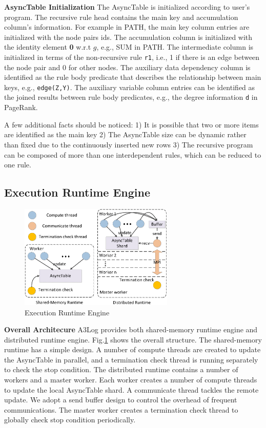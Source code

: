 \noindent\textbf{AsyncTable Initialization}
The AsyncTable is initialized according to user's program. The recursive rule head contains the main key and accumulation column's information. For example in PATH, the main key column entries are initialized with the node pairs ids. The accumulation column is initialized with the identity element \textbf{0} w.r.t $g$, e.g., SUM in PATH. The intermediate column is initialized in terms of the non-recursive rule \texttt{r1}, i.e., 1 if there is an edge between the node pair and 0 for other nodes. The auxiliary data dependency column is identified as the rule body predicate that describes the relationship between main keys, e.g., \texttt{edge(Z,Y)}. The auxiliary variable column entries can be identified as the joined results between rule body predicates, e.g., the degree information \texttt{d} in PageRank.

A few additional facts should be noticed: 1) It is possible that two or more items are identified as the main key  2) The AsyncTable size can be dynamic rather than fixed due to the continuously inserted new rows 3) The recursive program can be composed of more than one interdependent rules, which can be reduced to one rule.

\subsection{Execution Runtime Engine}
\label{sec:system:runtime}

\begin{figure}[!t]
    \centering
  \includegraphics[width=2.9in]{fig/runtime}
  \vspace{-0.0in}
  \caption{Execution Runtime Engine}
  \label{fig:runtime}
  \vspace{-0.1in}
\end{figure}

\noindent\textbf{Overall Architecure}
A3Log provides both shared-memory runtime engine and distributed runtime engine. Fig.\ref{fig:runtime} shows the overall structure. The shared-memory runtime has a simple design. A number of compute threads are created to update the AsyncTable in parallel, and a termination check thread is running separately to check the stop condition. The distributed runtime contains a number of workers and a master worker. Each worker creates a number of compute threads to update the local AsyncTable shard. A communicate thread tackles the remote update. We adopt a send buffer design to control the overhead of frequent communications. The master worker creates a termination check thread to globally check stop condition periodically.


